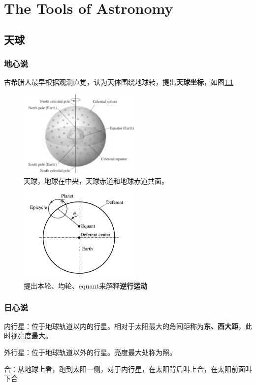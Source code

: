 \documentclass[openany]{ctexbook}
\begin{document}
\tableofcontents
\part{The Tools of Astronomy}
\chapter{天球}
\section{地心说}
古希腊人最早根据观测直觉，认为天体围绕地球转，提出{\bf 天球坐标}，如图\ref{fig:celestialsphere}
\begin{figure}[hbt]
	\centering
	\includegraphics[width=6cm]{chapters/01/celestialsphere}
	\caption{天球，地球在中央，天球赤道和地球赤道共面。}
	\label{fig:celestialsphere}
\end{figure}


\begin{figure}[hbt]
  \centering
  \includegraphics[width=6cm]{chapters/01/ptolemaicmodel}
  \caption{提出本轮、均轮、equant来解释{\bf 逆行运动}	}
  \label{fig:ptolemarcmodel}
\end{figure}

\section{日心说}
内行星：位于地球轨道以内的行星。相对于太阳最大的角间距称为{\bf 东、西大距}，此时视亮度最大。

外行星：位于地球轨道以外的行星。亮度最大处称为照。

合：从地球上看，跑到太阳一侧，对于内行星，在太阳背后叫上合，在太阳前面叫下合
\end{document}
